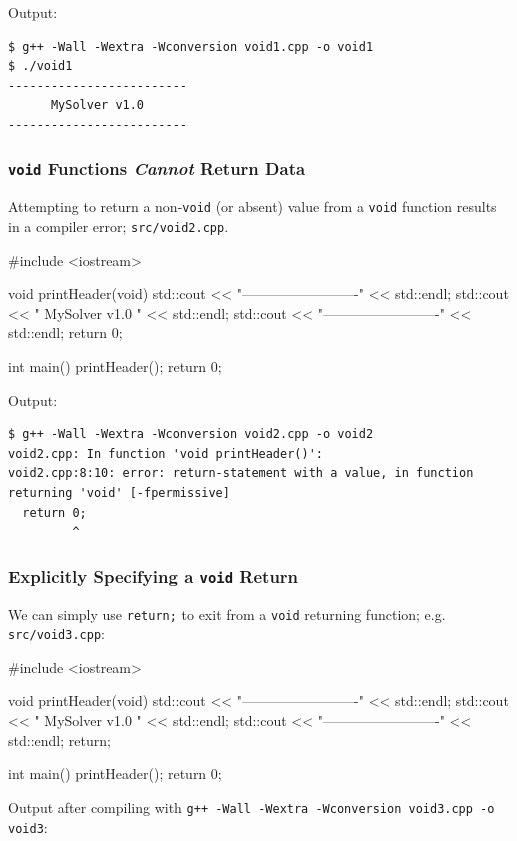 \documentclass[12pt,letterpaper,twoside]{article}
\begin{document}
Output:
{\small
\begin{verbatim}
$ g++ -Wall -Wextra -Wconversion void1.cpp -o void1
$ ./void1
-------------------------
      MySolver v1.0
-------------------------
\end{verbatim}
}

\subsubsection{\texttt{void} Functions \emph{Cannot} Return Data} Attempting to return
a non-\texttt{void} (or absent) value from a \texttt{void} function results in a compiler 
error; \texttt{src/void2.cpp}.

\begin{cpp}
#include <iostream>

void printHeader(void) {
  std::cout << "-------------------------" << std::endl;
  std::cout << "      MySolver v1.0      " << std::endl;
  std::cout << "-------------------------" << std::endl;
  return 0;
}

int main() {
  printHeader();
  return 0;
}
\end{cpp}

Output:

\begin{verbatim}
$ g++ -Wall -Wextra -Wconversion void2.cpp -o void2
void2.cpp: In function 'void printHeader()':
void2.cpp:8:10: error: return-statement with a value, in function returning 'void' [-fpermissive]
  return 0;
         ^
\end{verbatim}

\subsubsection{Explicitly Specifying a \texttt{void} Return} We can simply use \texttt{return;} to exit from a \texttt{void} returning function; e.g.
\texttt{src/void3.cpp}:

\begin{cpp}
#include <iostream>

void printHeader(void) {
  std::cout << "-------------------------" << std::endl;
  std::cout << "      MySolver v1.0      " << std::endl;
  std::cout << "-------------------------" << std::endl;
  return;
}

int main() {
  printHeader();
  return 0;
}
\end{cpp}

Output after compiling with \texttt{g++ -Wall -Wextra -Wconversion void3.cpp -o void3}:
\end{document}
